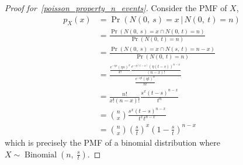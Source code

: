 \documentclass{article}
\begin{document}
\begin{proof}[Proof for~\ref{poisson_property_n_events}]
    Consider the PMF of \(X\),
    \begin{align*}
        p_X\left( x \right) & = \Pr{\left( N\left( 0,\: s \right) = x \,\vert\, N\left( 0,\: t \right) = n \right)}                                                                                                                                 \\
                            & = \frac{\Pr{\left( N\left( 0,\: s \right) = x \cap N\left( 0,\: t \right) = n \right)}}{\Pr{\left( N\left( 0,\: t \right) = n \right)}}                                                                               \\
                            & = \frac{\Pr{\left( N\left( 0,\: s \right) = x \cap N\left( s,\: t \right) = n - x \right)}}{\Pr{\left( N\left( 0,\: t \right) = n \right)}}                                                                           \\
                            & = \frac{\frac{e^{-\eta s} \left( \eta s \right)^x}{x!} \frac{e^{-\eta \left( t - s \right)} \left( \eta \left( t - s \right) \right)^{n - x}}{\left( n - x \right)!}}{\frac{e^{-\eta t} \left( \eta t \right)^n}{n!}} \\
                            & = \frac{n!}{x!\left( n - x \right)!} \frac{s^x \left( t - s \right)^{n - x}}{t^n}                                                                                                                                     \\
                            & = \binom{n}{x} \frac{s^x \left( t - s \right)^{n - x}}{t^x t^{n - x}}                                                                                                                                                 \\
                            & = \binom{n}{x} \left( \frac{s}{t} \right)^x \left( 1 - \frac{s}{t} \right)^{n - x}
    \end{align*}
    which is precisely the PMF of a binomial distribution where \(X \sim \operatorname{Binomial}{\left( n,\: \frac{s}{t} \right)}\).
\end{proof}
\end{document}
